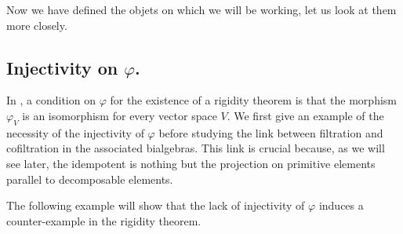 \documentclass[11pt,leqno]{amsart}
\theoremstyle{definition}
\theoremstyle{plain}
\begin{document}
Now we have defined the objets on which we will be working, let us look at them more closely.

\subsection{Injectivity on $\varphi$.}\label{inj}

In \cite{GBO}, a condition on $\varphi$ for the existence of a rigidity theorem is that the morphism $\varphi_V$ is an isomorphism for every vector space $V$. We first give an example of the necessity of the injectivity of $\varphi$ before studying the link between filtration and cofiltration in the associated bialgebras. This link is crucial because, as we will see later, the idempotent is nothing but the projection on primitive elements parallel to decomposable elements.

The following example will show that the lack of injectivity of $\varphi$ induces a counter-example in the rigidity theorem.
\end{document}
